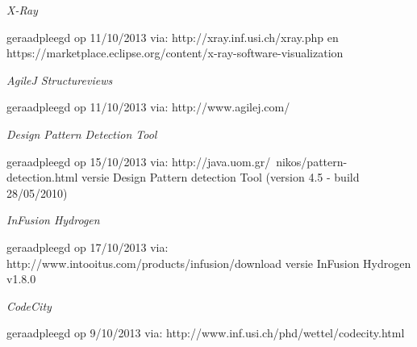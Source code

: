 \documentclass[i1]{oss}
\begin{document}
\begin{flushleft}
\begin{thebibliography}{4}

\emph{X-Ray}
\begin{scriptsize}
geraadpleegd op 11/10/2013 via: \mbox{http://xray.inf.usi.ch/xray.php} en \mbox{https://marketplace.eclipse.org/content/x-ray-software-visualization}
\end{scriptsize}

\emph{AgileJ Structureviews}
\begin{scriptsize}
geraadpleegd op 11/10/2013 via: \mbox{http://www.agilej.com/}
\end{scriptsize}

\emph{Design Pattern Detection Tool}
\begin{scriptsize}
geraadpleegd op 15/10/2013 via: \mbox{http://java.uom.gr/~nikos/pattern-detection.html} versie  Design Pattern detection Tool (version 4.5 - build 28/05/2010)
\end{scriptsize}

\emph{InFusion Hydrogen}
\begin{scriptsize}
geraadpleegd op 17/10/2013 via: \mbox{http://www.intooitus.com/products/infusion/download} versie InFusion Hydrogen v1.8.0
\end{scriptsize}

\emph{CodeCity}
\begin{scriptsize}
geraadpleegd op 9/10/2013 via: \mbox{http://www.inf.usi.ch/phd/wettel/codecity.html} 
\end{scriptsize}

\end{thebibliography}
\end{flushleft}
\end{document}
